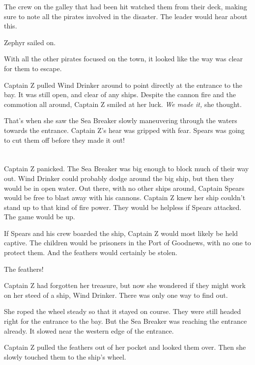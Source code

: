 \documentclass[12pt]{extbook}
\begin{document}
  The crew on the galley that had been hit watched them from their deck,
  making sure to note all the pirates involved in the disaster. The leader
  would hear about this.
  
  Zephyr sailed on.
  
  With all the other pirates focused on the town, it looked like the way
  was clear for them to escape.
  
  Captain Z pulled Wind Drinker around to point directly at the entrance
  to the bay. It was still open, and clear of any ships. Despite the
  cannon fire and the commotion all around, Captain Z smiled at her luck.
  \emph{We made it,} she thought.
  
  That's when she saw the Sea Breaker slowly maneuvering through the
  waters towards the entrance. Captain Z's hear was gripped with fear.
  Spears was going to cut them off before they made it out!
  
  \section{}\label{section-37}
  
  Captain Z panicked. The Sea Breaker was big enough to block much of
  their way out. Wind Drinker could probably dodge around the big ship,
  but then they would be in open water. Out there, with no other ships
  around, Captain Spears would be free to blast away with his cannons.
  Captain Z knew her ship couldn't stand up to that kind of fire power.
  They would be helpless if Spears attacked. The game would be up.
  
  If Spears and his crew boarded the ship, Captain Z would most likely be
  held captive. The children would be prisoners in the Port of Goodnews,
  with no one to protect them. And the feathers would certainly be stolen.
  
  The feathers!
  
  Captain Z had forgotten her treasure, but now she wondered if they might
  work on her steed of a ship, Wind Drinker. There was only one way to
  find out.
  
  She roped the wheel steady so that it stayed on course. They were still
  headed right for the entrance to the bay. But the Sea Breaker was
  reaching the entrance already. It slowed near the western edge of the
  entrance.
  
  Captain Z pulled the feathers out of her pocket and looked them over.
  Then she slowly touched them to the ship's wheel.
  
\end{document}
